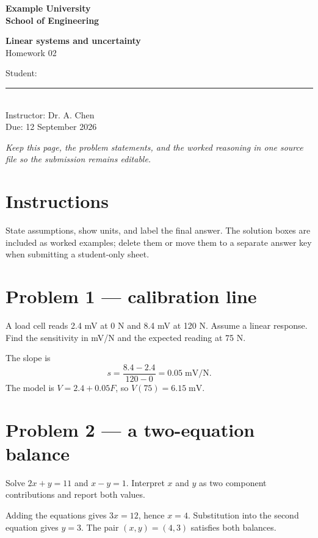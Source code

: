 \documentclass[12pt,a4paper]{article}
\newcommand{\hwNumber}{02}
\newcommand{\hwTitle}{Linear systems and uncertainty}
\begin{document}
\begin{titlepage}
\centering
\vspace*{18mm}
{\Large\bfseries Example University\\[3mm] School of Engineering}\par
\vfill
{\Huge\bfseries \hwTitle\\[5mm]}
{\Large Homework \hwNumber}\par
\vfill
{\large Student: \rule{65mm}{0.4pt}\\[4mm]
Instructor: Dr. A. Chen\\[4mm]
Due: 12 September 2026}\par
\vfill
\textit{Keep this page, the problem statements, and the worked reasoning in
one source file so the submission remains editable.}
\end{titlepage}

\section*{Instructions}
State assumptions, show units, and label the final answer.  The solution boxes
are included as worked examples; delete them or move them to a separate answer
key when submitting a student-only sheet.

\section*{Problem 1 — calibration line}
\begin{givenbox}
A load cell reads 2.4 mV at 0 N and 8.4 mV at 120 N.  Assume a linear response.
Find the sensitivity in mV/N and the expected reading at 75 N.
\end{givenbox}
\begin{solutionbox}
The slope is
\[
  s=\frac{8.4-2.4}{120-0}=0.05\;\mathrm{mV/N}.
\]
The model is $V=2.4+0.05F$, so $V(75)=6.15\;\mathrm{mV}$.
\end{solutionbox}

\section*{Problem 2 — a two-equation balance}
\begin{givenbox}
Solve $2x+y=11$ and $x-y=1$.  Interpret $x$ and $y$ as two component
contributions and report both values.
\end{givenbox}
\begin{solutionbox}
Adding the equations gives $3x=12$, hence $x=4$.  Substitution into the second
equation gives $y=3$.  The pair $(x,y)=(4,3)$ satisfies both balances.
\end{solutionbox}
\end{document}
